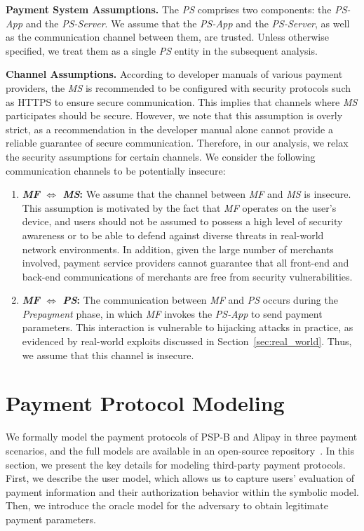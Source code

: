\documentclass[journal]{IEEEtran}
\newcommand{\Rom}[1]{\uppercase\expandafter{\romannumeral #1}}
\providecommand{\DIFaddbegin}{} %
\providecommand{\DIFaddend}{} %
\providecommand{\DIFaddincludegraphics}[2][]{{\color{blue}\fbox{\DIFOincludegraphics[#1]{#2}}}} %
\DeclareRobustCommand{\DIFaddbegin}{\DIFOaddbegin \let\includegraphics\DIFaddincludegraphics} %
\DeclareRobustCommand{\DIFaddend}{\DIFOaddend \let\includegraphics\DIFOincludegraphics} %
\begin{document}
\textbf{Payment System Assumptions.}
The \emph{PS} comprises two components: the \emph{PS-App} and the \emph{PS-Server}.  
We assume that the \emph{PS-App} and the \emph{PS-Server}, as well as the communication channel between them, are trusted. 
Unless otherwise specified, we treat them as a single \emph{PS} entity in the subsequent analysis.

\textbf{Channel Assumptions.}
According to developer manuals of various payment providers, the \emph{MS} is recommended to be configured with security protocols such as HTTPS to ensure secure communication. 
This implies that channels where \emph{MS} participates should be secure.
However, we note that this assumption is overly strict, as a recommendation in the developer manual alone cannot provide a reliable guarantee of secure communication. 
Therefore, in our analysis, we relax the security assumptions for certain channels.
We consider the following communication channels to be potentially insecure:
\begin{enumerate}[leftmargin=*]
\item[\Rom{1}.] \textbf{\emph{MF} $\Longleftrightarrow$ \emph{MS}:}
  We assume that the channel between \emph{MF} and \emph{MS} is insecure.
  This assumption is motivated by the fact that \emph{MF} operates on the user's device, and users should not be assumed to possess a high level of security awareness or to be able to defend against diverse threats in real-world network environments.
  In addition, given the large number of merchants involved, payment service providers cannot guarantee that all front-end and back-end communications of merchants are free from security vulnerabilities.
\item[\Rom{2}.] \textbf{\emph{MF} $\Longleftrightarrow$ \emph{PS}:}
  The communication between \emph{MF} and \emph{PS} occurs during the \emph{Prepayment} phase, in which \emph{MF} invokes the \emph{PS-App} to send payment parameters.
  This interaction is vulnerable to hijacking attacks in practice, as evidenced by real-world exploits discussed in Section~\ref{sec:real_world}.
  Thus, we assume that this channel is insecure.
\end{enumerate}


\section{Payment Protocol Modeling} \DIFaddbegin \label{sec:modeling}
\DIFaddend %
We formally model the payment protocols of PSP-B and Alipay in three payment scenarios, and the full models are available in an open-source repository~\cite{third_payment_model_2026}.
In this section, we present the key details for modeling third-party payment protocols.
First, we describe the user model, which allows us to capture users' evaluation of payment information and their authorization behavior within the symbolic model.
Then, we introduce the oracle model for the adversary to obtain legitimate payment parameters.
\end{document}
